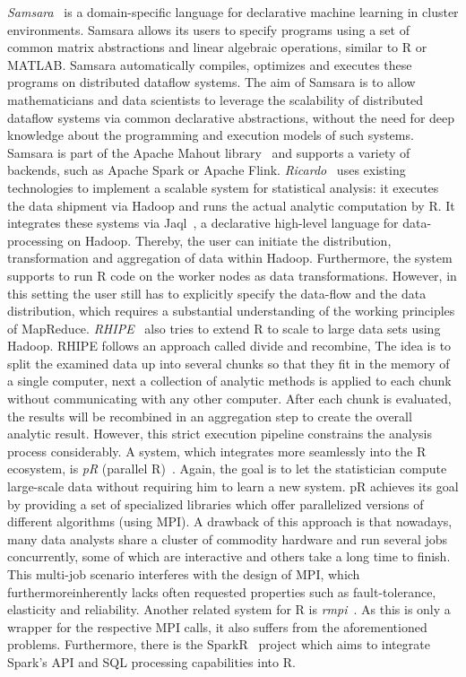 {\em Samsara}~\cite{Lyubimov2016, Schelter2016} is a domain-specific language for declarative machine learning in cluster environments. Samsara allows its users to specify programs using a set of common matrix abstractions and linear algebraic operations, similar to R or MATLAB. Samsara automatically compiles, optimizes and executes these programs on distributed dataflow systems. The aim of Samsara is to allow mathematicians and data scientists to leverage the scalability of distributed dataflow systems via common declarative abstractions, without the need for deep knowledge about the programming and execution models of such systems. Samsara is part of the Apache Mahout library~\cite{mahout:2011a} and supports a variety of backends, such as Apache Spark or Apache Flink. {\em Ricardo}~\cite{das:2010a} uses existing technologies to implement a scalable system for statistical analysis: it executes the data shipment via Hadoop and runs the actual analytic computation by R. It integrates these systems via Jaql~\cite{beyer:2011a}, a declarative high-level language for data-processing on Hadoop. Thereby, the user can initiate the distribution, transformation and aggregation of data within Hadoop. Furthermore, the system supports to run R code on the worker nodes as data transformations. However, in this setting the user still has to explicitly specify the data-flow and the data distribution, which requires a substantial understanding of the working principles of MapReduce. {\em RHIPE}~\cite{guha:s2012a} also tries to extend R to scale to large data sets using Hadoop. RHIPE follows an approach called divide and recombine, The idea is to split the examined data up into several chunks so that they fit in the memory of a single computer, next a collection of analytic methods is applied to each chunk without communicating with any other computer. After each chunk is evaluated, the results will be recombined in an aggregation step to create the overall analytic result. However, this strict execution pipeline constrains the analysis process considerably. A system, which integrates more seamlessly into the R ecosystem, is {\em pR} (parallel R)~\cite{samatova:2009a}. Again, the goal is to let the statistician compute large-scale data without requiring him to learn a new system. pR achieves its goal by providing a set of specialized libraries which offer parallelized versions of different algorithms (using MPI). A drawback of this approach is that nowadays, many data analysts share a cluster of commodity hardware and run several jobs concurrently, some of which are interactive and others take a long time to finish. This multi-job scenario interferes with the design of MPI, which furthermoreinherently lacks often requested properties such as fault-tolerance, elasticity and reliability. Another related system for R is {\em rmpi}~\cite{rmpi}. As this is only a wrapper for the respective MPI calls, it also suffers from the aforementioned problems. Furthermore, there is the SparkR~\cite{Venkataraman2016} project which aims to integrate Spark's API and SQL processing capabilities into R.

